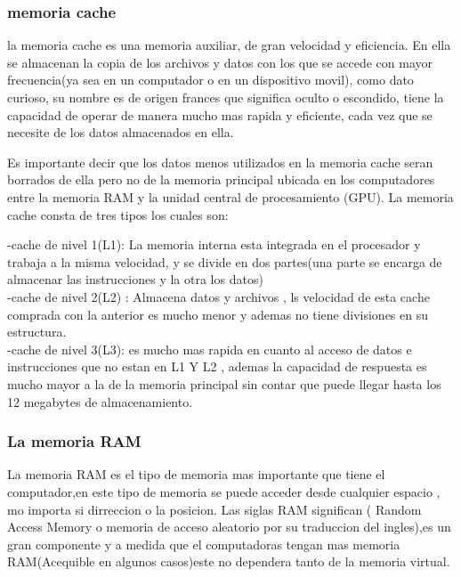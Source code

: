 \documentclass{article}
\begin{document}
        \subsubsection{memoria cache}
        la memoria cache es una memoria auxiliar, de gran velocidad y eficiencia. En ella se almacenan la copia de los archivos y datos con los que se accede con mayor frecuencia(ya sea en un computador o en un dispositivo movil),
        como dato curioso, su nombre es de origen frances que significa oculto o escondido, tiene la capacidad de operar de manera mucho mas rapida y eficiente, cada vez que se necesite de los datos almacenados en ella.\cite{academia1}
        
        Es importante decir que los datos menos utilizados en la memoria cache seran borrados de ella pero no de la memoria principal
        ubicada en los computadores entre la memoria RAM y la unidad central de procesamiento (GPU).
        La memoria cache consta de tres tipos los cuales son:
            
           
            -cache de nivel 1(L1): La memoria interna  esta integrada en el procesador y trabaja a la misma velocidad, y se divide en dos partes(una parte se encarga de almacenar las instrucciones y la otra los datos)\\
            
            
            -cache de nivel 2(L2) : Almacena datos y archivos , ls velocidad de esta cache comprada con la anterior es mucho menor y ademas no tiene divisiones en su estructura.\\
            
           
            -cache de nivel 3(L3): es mucho mas rapida en cuanto al acceso de datos e instrucciones que no estan en L1 Y L2 , ademas la capacidad de respuesta es mucho mayor a la de la memoria principal sin contar que puede llegar hasta los 12 megabytes de almacenamiento.\\
        
        \subsubsection{La memoria RAM}
        La memoria RAM es el tipo de memoria mas importante que tiene el computador,en este tipo de memoria se puede acceder desde cualquier espacio , mo importa si dirreccion o la posicion. Las siglas RAM significan ( Random Access Memory o memoria de acceso aleatorio por su traduccion del ingles),es un gran componente y a medida que el computadoras tengan mas memoria RAM(Acequible en algunos casos)este no dependera tanto de la memoria virtual.
        
\end{document}
